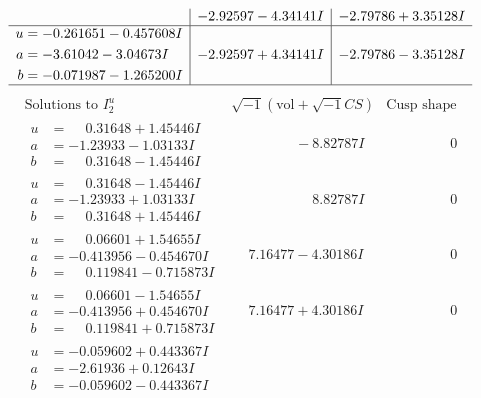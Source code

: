 \documentclass[1p]{elsarticle_modified}
\theoremstyle{definition}
\newcommand{\I}{\sqrt{-1}}
\begin{document}
$$\begin{array}{c|c|c}
 & -2.92597 - 4.34141 I & -2.79786 + 3.35128 I \\ \hline\begin{aligned}
u &= -0.261651 - 0.457608 I \\
a &= -3.61042 - 3.04673 I \\
b &= -0.071987 - 1.265200 I\end{aligned}
 & -2.92597 + 4.34141 I & -2.79786 - 3.35128 I\\
 \hline 
 \end{array}$$\newpage$$\begin{array}{c|c|c}  
\text{Solutions to }I^u_{2}& \I (\text{vol} + \sqrt{-1}CS) & \text{Cusp shape}\\
 \hline 
\begin{aligned}
u &= \phantom{-}0.31648 + 1.45446 I \\
a &= -1.23933 - 1.03133 I \\
b &= \phantom{-}0.31648 - 1.45446 I\end{aligned}
 & \phantom{-0.000000 } -8.82787 I & \phantom{-0.000000 } 0 \\ \hline\begin{aligned}
u &= \phantom{-}0.31648 - 1.45446 I \\
a &= -1.23933 + 1.03133 I \\
b &= \phantom{-}0.31648 + 1.45446 I\end{aligned}
 & \phantom{-0.000000 -}8.82787 I & \phantom{-0.000000 } 0 \\ \hline\begin{aligned}
u &= \phantom{-}0.06601 + 1.54655 I \\
a &= -0.413956 - 0.454670 I \\
b &= \phantom{-}0.119841 - 0.715873 I\end{aligned}
 & \phantom{-}7.16477 - 4.30186 I & \phantom{-0.000000 } 0 \\ \hline\begin{aligned}
u &= \phantom{-}0.06601 - 1.54655 I \\
a &= -0.413956 + 0.454670 I \\
b &= \phantom{-}0.119841 + 0.715873 I\end{aligned}
 & \phantom{-}7.16477 + 4.30186 I & \phantom{-0.000000 } 0 \\ \hline\begin{aligned}
u &= -0.059602 + 0.443367 I \\
a &= -2.61936 + 0.12643 I \\
b &= -0.059602 - 0.443367 I\end{aligned}

\end{array}$$
\end{document}
